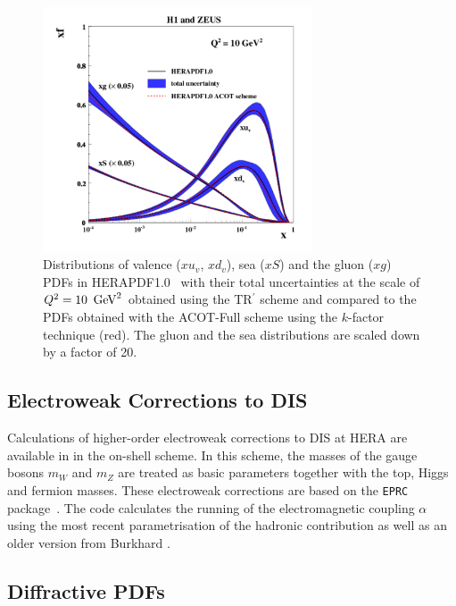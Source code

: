 \begin{itemize}
\begin{figure}[!ht]
\centering
\includegraphics[width=8cm]{heraacot}
   \caption{Distributions of valence ($xu_v$, $xd_v$), sea ($xS$) and the gluon ($xg$) PDFs in HERAPDF1.0~\cite{h1zeus:2009wt}
       with their total uncertainties at the scale of $Q^2 = 10\ \,\text{Ge\hspace{-.08em}V}^2$ obtained 
       using the TR$^\prime$ scheme and compared to the PDFs obtained with 
       the ACOT-Full scheme using the $k$-factor technique (red).
       The gluon and the sea distributions are scaled down by a factor of 20.}
 \label{fig:acotrt}
\end{figure}


\end{itemize}

\subsection{Electroweak Corrections to DIS}
Calculations of higher-order electroweak corrections to DIS at 
HERA are available in \fitter in the on-shell scheme. In this scheme, the
masses of the gauge bosons $m_W$ and 
$m_Z$ are treated as basic parameters together with the top, 
Higgs and fermion masses.
These electroweak corrections 
are based on the \texttt{EPRC} package~\cite{SpiesbergerPrivComm}.
The code calculates the running of the electromagnetic coupling $\alpha$ using the most recent parametrisation
of the hadronic contribution
\cite{Jegerlehner} as well as 
an older version from Burkhard \cite{Burkhard}.



\subsection{Diffractive PDFs}

